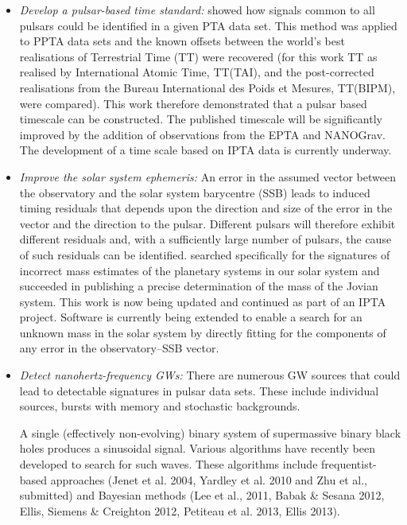 \documentclass{raa}            %
\begin{document}
\begin{itemize}
\item {\emph{Develop a pulsar-based time standard:} \cite{hcm+12} showed how signals common to all pulsars could be identified in a given PTA data set. This method was applied to PPTA data sets and the known offsets between the world's best realisations of Terrestrial Time (TT) were recovered (for this work TT as realised by International Atomic Time, TT(TAI), and the post-corrected realisations from the Bureau International des Poids et  Mesures, TT(BIPM), were compared).  This work therefore demonstrated that a pulsar based timescale can be constructed. The published timescale will be significantly improved by the addition of observations from the EPTA and NANOGrav.  The development of a time scale based on IPTA data is currently underway.}
\item {\emph{Improve the solar system ephemeris:} An error in the assumed vector between the observatory and the solar system barycentre (SSB) leads to induced timing residuals that depends upon the direction and size of the error in the vector and the direction to the pulsar.  Different pulsars will therefore exhibit different residuals and, with a sufficiently large number of pulsars, the cause of such residuals can be identified. \cite{chm+10} searched specifically for the signatures of incorrect mass estimates of the planetary systems in our solar system and succeeded in publishing a precise determination of the mass of the Jovian system.  This work is now being updated and continued as part of an IPTA project. Software is currently being extended to enable a search for an unknown mass in the solar system by directly fitting for the components of any error in the observatory--SSB vector.}
\item {\emph{Detect nanohertz-frequency GWs:} There are numerous GW sources that could lead to detectable signatures in pulsar data sets.  These include individual sources, bursts with memory and stochastic backgrounds. 

A single (effectively non-evolving) binary system of supermassive binary black holes produces a sinusoidal signal.  Various algorithms have recently been developed to search for such waves.  These algorithms include frequentist-based approaches (Jenet et al. 2004\nocite{jllw04}, Yardley et al. 2010\nocite{yhj+10} and Zhu et al., submitted) and Bayesian methods (Lee et al., 2011\nocite{lwk+11}, Babak \& Sesana 2012\nocite{bs12}, Ellis, Siemens \& Creighton 2012\nocite{esc12}, Petiteau et al. 2013\nocite{pbs+13}, Ellis 2013\nocite{ell13}).  

}
\end{itemize}
\end{document}
